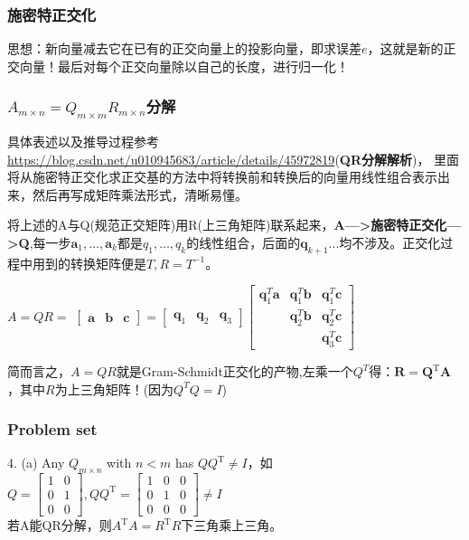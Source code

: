     \subsubsection{施密特正交化}
    思想：新向量减去它在已有的正交向量上的投影向量，即求误差$e$，这就是新的正交向量！最后对每个正交向量除以自己的长度，进行归一化！

    \subsubsection{$A_{m\times n}=Q_{m\times m}R_{m\times n}$分解}
    具体表述以及推导过程参考\url{https://blog.csdn.net/u010945683/article/details/45972819}(\textbf{QR分解解析})，
    里面将从施密特正交化求正交基的方法中将转换前和转换后的向量用线性组合表示出来，然后再写成矩阵乘法形式，清晰易懂。

    将上述的A与Q(规范正交矩阵)用R(上三角矩阵)联系起来，\textbf{A--->施密特正交化--->Q},每一步$\boldsymbol{a}_{1}, \dots, \boldsymbol{a}_{k}$都是$q_{1}, \ldots, q_{k}$的线性组合，后面的$\bm{q}_{k+1}...$均不涉及。正交化过程中用到的转换矩阵便是$T,R=T^{-1}$。

    $A=Q R=$
    $\left[\begin{array}{lll}{\bm{a}} & {\bm{b}} & {\bm{c}}\end{array}\right]=\left[\begin{array}{lll}{\bm{q}_{1}} & {\bm{q}_{2}} & {\bm{q}_{3}}\end{array}\right]\left[\begin{array}{ccc}{\bm{q}_{1}^{T} \bm{a}} & {\bm{q}_{1}^{T} \bm{b}} & {\bm{q}_{1}^{T} \bm{c}} \\ {} & {\bm{q}_{2}^{T} \bm{b}} & {\bm{q}_{2}^{T} \bm{c}} \\ {} & {} & {\bm{q}_{3}^{T} \bm{c}}\end{array}\right]$

    简而言之，$A=Q R$就是Gram-Schmidt正交化的产物,左乘一个$Q^T$得：$\boldsymbol{R}=\boldsymbol{Q}^{\mathrm{T}} \boldsymbol{A}$，其中$R$为上三角矩阵！(因为$Q^T Q = I$)

    \subsubsection{Problem set}
    4. (a) Any $Q_{m\times n}$ with $n<m$ has $Q Q^{\mathrm{T}} \neq I$，如$Q=\left[\begin{array}{ll}{1} & {0} \\ {0} & {1} \\ {0} & {0}\end{array}\right], Q Q^{\mathrm{T}}=\left[\begin{array}{ccc}{1} & {0} & {0} \\ {0} & {1} & {0} \\ {0} & {0} & {0}\end{array}\right] \neq I$
    \\
    若A能QR分解，则$A^{\mathrm{T}} A=R^{\mathrm{T}} R$下三角乘上三角。